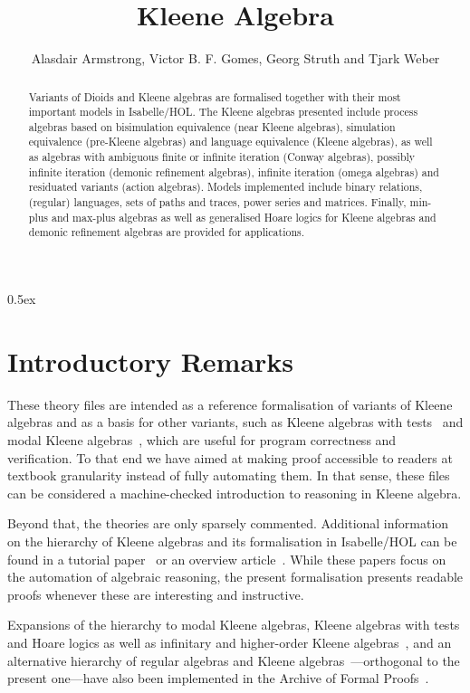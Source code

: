 \documentclass[11pt,a4paper]{article}
\begin{document}
\title{Kleene Algebra}
\author{Alasdair Armstrong, Victor B. F. Gomes, Georg Struth and Tjark Weber}

\maketitle

\begin{abstract}
  Variants of Dioids and Kleene algebras are formalised together with
  their most important models in Isabelle/HOL.  The Kleene algebras
  presented include process algebras based on bisimulation equivalence
  (near Kleene algebras), simulation equivalence (pre-Kleene algebras)
  and language equivalence (Kleene algebras), as well as algebras with
  ambiguous finite or infinite iteration (Conway algebras), possibly
  infinite iteration (demonic refinement algebras), infinite iteration
  (omega algebras) and residuated variants (action algebras).  Models
  implemented include binary relations, (regular) languages, sets of
  paths and traces, power series and matrices.  Finally, min-plus and
  max-plus algebras as well as generalised Hoare logics for Kleene
  algebras and demonic refinement algebras are provided for applications.
\end{abstract}

\tableofcontents

\parindent 0pt\parskip 0.5ex

\section{Introductory Remarks}

These theory files are intended as a reference formalisation of
variants of Kleene algebras and as a basis for other variants, such as
Kleene algebras with tests~\cite{kat} and modal Kleene
algebras~\cite{kad}, which are useful for program correctness and
verification. To that end we have aimed at making proof accessible to
readers at textbook granularity instead of fully automating them.  In
that sense, these files can be considered a machine-checked
introduction to reasoning in Kleene algebra.

Beyond that, the theories are only sparsely commented. Additional
information on the hierarchy of Kleene algebras and its formalisation
in Isabelle/HOL can be found in a tutorial
paper~\cite{fosterstruthweber11tutorial} or an overview
article~\cite{guttmannstruthweber11tarskikleene}. While these papers
focus on the automation of algebraic reasoning, the present
formalisation presents readable proofs whenever these are interesting
and instructive.

Expansions of the hierarchy to modal Kleene algebras, Kleene algebras
with tests and Hoare logics as well as infinitary and higher-order
Kleene
algebras~\cite{guttmannstruthweber11algmeth,armstrongstruth12hoka},
and an alternative hierarchy of regular algebras and Kleene
algebras~\cite{fosterstruth12regalg}---orthogonal to the present
one---have also been implemented in the Archive of Formal
Proofs~\cite{regalg,kad,kat,rel}.





\end{document}
